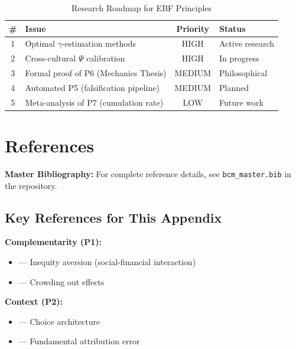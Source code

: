 \begin{table}[htbp]
\centering
\caption{Research Roadmap for EBF Principles}
\label{tab:pr-roadmap}
\renewcommand{\arraystretch}{1.3}
\begin{tabular}{@{}clcl@{}}
\toprule
\textbf{\#} & \textbf{Issue} & \textbf{Priority} & \textbf{Status} \\
\midrule
1 & Optimal $\gamma$-estimation methods & HIGH & Active research \\
2 & Cross-cultural $\Psi$ calibration & HIGH & In progress \\
3 & Formal proof of P6 (Mechanics Thesis) & MEDIUM & Philosophical \\
4 & Automated P5 (falsification pipeline) & MEDIUM & Planned \\
5 & Meta-analysis of P7 (cumulation rate) & LOW & Future work \\
\bottomrule
\end{tabular}
\end{table}


\section{References}
\label{sec:pr-references}

\begin{tcolorbox}[colback=blue!5!white, colframe=blue!75!black]
\textbf{Master Bibliography:} For complete reference details, see
\texttt{bcm\_master.bib} in the repository.
\end{tcolorbox}

\subsection{Key References for This Appendix}

\textbf{Complementarity (P1):}
\begin{itemize}[nosep]
    \item \citet{fehr1999theory} --- Inequity aversion (social-financial interaction)
    \item \citet{gneezy2011pays} --- Crowding out effects
\end{itemize}

\textbf{Context (P2):}
\begin{itemize}[nosep]
    \item \citet{thaler2008nudge} --- Choice architecture
    \item \citet{ross1977intuitive} --- Fundamental attribution error
\end{itemize}

